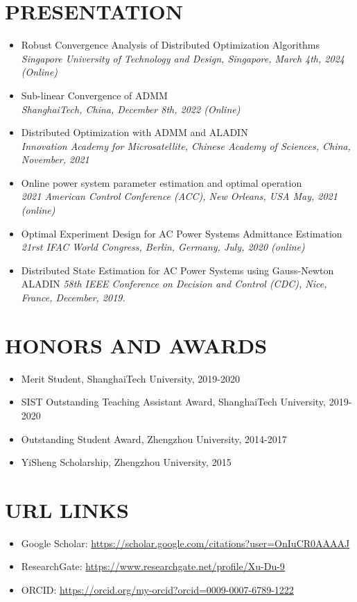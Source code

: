 \documentclass[paper=a4,fontsize=11pt]{scrartcl} %
\newcommand{\sepspace}{\vspace*{1em}}		%
\newcommand{\NewPart}[1]{\section*{\uppercase{#1}}}
\newcommand{\EducationEntry}[4]{
		\noindent \textbf{#1} \hfill      %
		\colorbox{White}{%
			\parbox{5cm}{%
			\hfill\color{Black}#2}} \par  %
		\noindent \textit{#3} \par        %
		\noindent\hangindent=2em\hangafter=0 \small #4 %
		\normalsize \par}
\begin{document}
\NewPart{PRESENTATION}{}
\begin{itemize}
		\item  {
		{Robust Convergence Analysis of Distributed Optimization Algorithms}\\
		\emph{Singapore University of Technology and Design, Singapore, March 4th, 2024 (Online)
	} }
	
		\item  {
		{Sub-linear Convergence of ADMM}\\
		\emph{ShanghaiTech, China, December 8th, 2022 (Online)
	} }
	
	\item  {
		{Distributed Optimization with ADMM and ALADIN}\\
		\emph{Innovation Academy for Microsatellite, Chinese Academy of Sciences, China,
			November, 2021
	} }
	
	\item  {
		{Online power system parameter estimation and optimal operation}\\
		\emph{2021 American Control Conference (ACC), New Orleans, USA May, 2021 (online)
	} }
	
	\item  {
		Optimal Experiment Design for AC Power Systems Admittance Estimation\\
		\emph{21rst IFAC World Congress, Berlin, Germany, July, 2020 (online)
	} }
	
	\item  {
		Distributed State Estimation for AC Power Systems using Gauss-Newton ALADIN 
		\emph{58th IEEE Conference on Decision and Control (CDC),
			Nice, France, December, 2019.} }
\end{itemize}


\NewPart{HONORS AND AWARDS}
\begin{itemize}
	\item Merit Student, ShanghaiTech University, 2019-2020
	
	\item SIST Outstanding Teaching Assistant Award, ShanghaiTech University, 2019-2020
		
	
	\item Outstanding Student Award, Zhengzhou University, 2014-2017
	
	\item YiSheng Scholarship, Zhengzhou University, 2015
	
	
	\end{itemize}
%
\NewPart{URL Links}
\begin{itemize}
	\item Google Scholar: \url{https://scholar.google.com/citations?user=OnIuCR0AAAAJ}
	\item ResearchGate: \url{https://www.researchgate.net/profile/Xu-Du-9}
	\item ORCID: \url{https://orcid.org/my-orcid?orcid=0009-0007-6789-1222}
\end{itemize}
\end{document}
